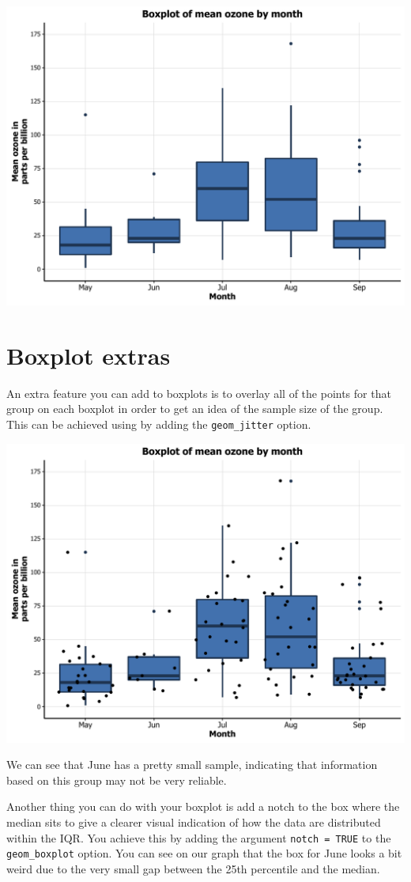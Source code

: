 \begin{center}\includegraphics[width=0.55\linewidth]{figures/box_13-1} \end{center}

\section{Boxplot extras}\label{boxplot-extras}

An extra feature you can add to boxplots is to overlay all of the points
for that group on each boxplot in order to get an idea of the sample
size of the group. This can be achieved using by adding the
\texttt{geom\_jitter} option.

\begin{Shaded}
\begin{Highlighting}[]
\StringTok{ }\StringTok{ }\NormalTok{()}
\end{Highlighting}
\end{Shaded}

\begin{center}\includegraphics[width=0.55\linewidth]{figures/box_14-1} \end{center}

We can see that June has a pretty small sample, indicating that
information based on this group may not be very reliable.

Another thing you can do with your boxplot is add a notch to the box
where the median sits to give a clearer visual indication of how the
data are distributed within the IQR. You achieve this by adding the
argument \texttt{notch\ =\ TRUE} to the \texttt{geom\_boxplot} option.
You can see on our graph that the box for June looks a bit weird due to
the very small gap between the 25th percentile and the median.

